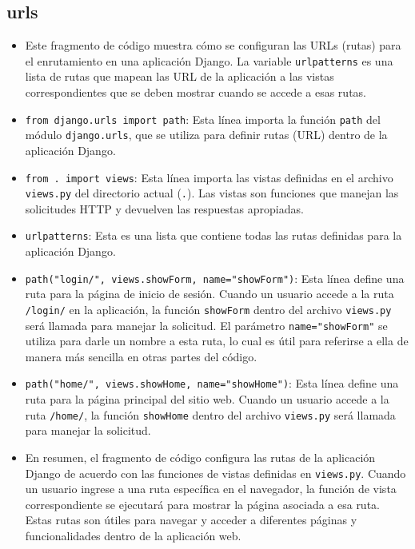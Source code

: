 \documentclass{article}
\begin{document}
\subsection{urls}
\begin{itemize}	
	\item Este fragmento de código muestra cómo se configuran las URLs (rutas) para el enrutamiento en una aplicación Django. La variable \texttt{urlpatterns} es una lista de rutas que mapean las URL de la aplicación a las vistas correspondientes que se deben mostrar cuando se accede a esas rutas.
	\item \texttt{from django.urls import path}: Esta línea importa la función \texttt{path} del módulo \texttt{django.urls}, que se utiliza para definir rutas (URL) dentro de la aplicación Django.

\item \texttt{from . import views}: Esta línea importa las vistas definidas en el archivo \texttt{views.py} del directorio actual (\texttt{.}). Las vistas son funciones que manejan las solicitudes HTTP y devuelven las respuestas apropiadas.

\item \texttt{urlpatterns}: Esta es una lista que contiene todas las rutas definidas para la aplicación Django.

\item \texttt{path("login/", views.showForm, name="showForm")}: Esta línea define una ruta para la página de inicio de sesión. Cuando un usuario accede a la ruta \texttt{/login/} en la aplicación, la función \texttt{showForm} dentro del archivo \texttt{views.py} será llamada para manejar la solicitud. El parámetro \texttt{name="showForm"} se utiliza para darle un nombre a esta ruta, lo cual es útil para referirse a ella de manera más sencilla en otras partes del código.


\item \texttt{path("home/", views.showHome, name="showHome")}: Esta línea define una ruta para la página principal del sitio web. Cuando un usuario accede a la ruta \texttt{/home/}, la función \texttt{showHome} dentro del archivo \texttt{views.py} será llamada para manejar la solicitud.

\item En resumen, el fragmento de código configura las rutas de la aplicación Django de acuerdo con las funciones de vistas definidas en \texttt{views.py}. Cuando un usuario ingrese a una ruta específica en el navegador, la función de vista correspondiente se ejecutará para mostrar la página asociada a esa ruta. Estas rutas son útiles para navegar y acceder a diferentes páginas y funcionalidades dentro de la aplicación web.

\end{itemize}	
	
\end{document}
